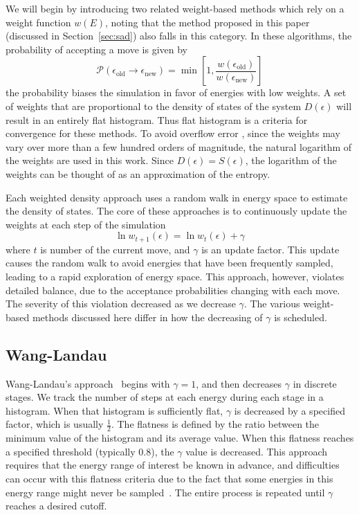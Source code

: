 \documentclass[letterpaper,twocolumn,amsmath,amssymb,pre,aps,10pt]{revtex4-1}
\begin{document}
We will begin by introducing two related weight-based methods which
rely on a weight function $w(E)$, noting that the method proposed in
this paper (discussed in Section~\ref{sec:sad}) also falls in this
category.  In these algorithms, the probability of accepting a move is
given by
\begin{equation}
	\mathcal{P}(\epsilon_\text{old} \rightarrow \epsilon_\text{new})
	= \min\left[1,\frac{w(\epsilon_\text{old})}{w(\epsilon_\text{new})}\right]
\end{equation}
the probability biases the simulation in favor of energies with low weights.  
A set of weights that are proportional to the density of states of the
system $D(\epsilon)$ will result in an entirely flat histogram.  Thus
flat histogram is a criteria for convergence for these methods.  To avoid 
overflow error , since the weights may vary over more than a
few hundred orders of magnitude, the natural logarithm of the weights are used 
in this work.  Since $D(\epsilon) = S(\epsilon)$, the logarithm of the weights 
can be thought of as an approximation of the entropy.

Each weighted density approach uses a random walk in energy space to
estimate the density of states.  The core of these approaches
is to continuously update the weights at each step of the simulation
\begin{equation}
	\ln{w_{t+1}(\epsilon)}=\ln{w_{t}(\epsilon)}
	+\gamma
\end{equation}
where $t$ is number of the current move, and $\gamma$ is an update
factor.  This update causes the random walk to avoid energies that
have been frequently sampled, leading to a rapid exploration of energy
space.  This approach, however, violates detailed balance, due to the
acceptance probabilities changing with each move.  The severity of
this violation decreased as we decrease $\gamma$.  The various
weight-based methods discussed here differ in how the decreasing of $\gamma$
is scheduled.

\subsection{Wang-Landau}

Wang-Landau's approach~\cite{wang2001efficient,wang2001determining,
  landau2014guide} begins with $\gamma=1$, and then decreases $\gamma$
in discrete stages.  We track the number of steps at each energy during
each stage in a histogram.  When that histogram is sufficiently flat,
$\gamma$ is decreased by a specified factor, which is usually
$\frac12$.  The flatness is defined by the ratio between the minimum
value of the histogram and its average value.  When this flatness
reaches a specified threshold (typically 0.8), the $\gamma$ value is
decreased.  This approach requires that the energy range of interest
be known in advance, and difficulties can occur with this flatness
criteria due to the fact that some energies in this energy range might
never be sampled~\cite{haber2014transition}.  The entire process is
repeated until $\gamma$ reaches a desired cutoff.
\end{document}
